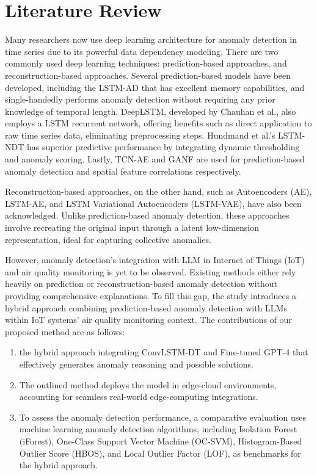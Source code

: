 \documentclass[final,3p,times,twocolumn]{elsarticle}
\begin{document}
\section{Literature Review}\label{sec2}
Many researchers now use deep learning architecture for anomaly detection in time series due to its powerful data dependency modeling. There are two commonly used deep learning techniques: prediction-based approaches, and reconstruction-based approaches. Several prediction-based models have been developed, including the LSTM-AD that has excellent memory capabilities, and single-handedly performs anomaly detection without requiring any prior knowledge of temporal length. DeepLSTM, developed by Chauhan et al., also employs a LSTM recurrent network, offering benefits such as direct application to raw time series data, eliminating preprocessing steps. Hundmand et al.'s LSTM-NDT has superior predictive performance by integrating dynamic thresholding and anomaly scoring. Lastly, TCN-AE and GANF are used for prediction-based anomaly detection and spatial feature correlations respectively. 

Reconstruction-based approaches, on the other hand, such as Autoencoders (AE), LSTM-AE, and LSTM Variational Autoencoders (LSTM-VAE), have also been acknowledged. Unlike prediction-based anomaly detection, these approaches involve recreating the original input through a latent low-dimension representation, ideal for capturing collective anomalies. 

However, anomaly detection's integration with LLM in Internet of Things (IoT) and air quality monitoring is yet to be observed. Existing methods either rely heavily on prediction or reconstruction-based anomaly detection without providing comprehensive explanations. To fill this gap, the study introduces a hybrid approach combining prediction-based anomaly detection with LLMs within IoT systems' air quality monitoring context. 
The contributions of our proposed method are as follows: 
\begin{enumerate}
\item the hybrid approach integrating ConvLSTM-DT and Fine-tuned GPT-4 that effectively generates anomaly reasoning and possible solutions. 
\item The outlined method deploys the model in edge-cloud environments, accounting for seamless real-world edge-computing integrations. 
\item To assess the anomaly detection performance, a comparative evaluation uses machine learning anomaly detection algorithms, including Isolation Forest (iForest), One-Class Support Vector Machine (OC-SVM), Histogram-Based Outlier Score (HBOS), and Local Outlier Factor (LOF), as benchmarks for the hybrid approach.
\end{enumerate}
\end{document}
